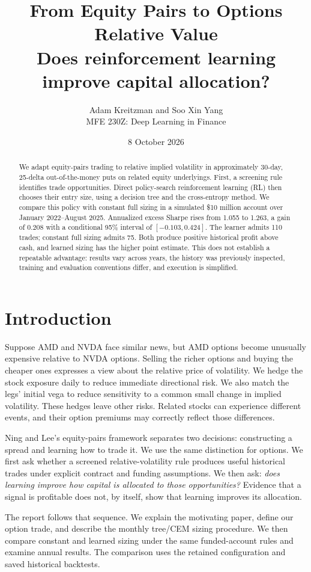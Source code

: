\documentclass[11pt,letterpaper]{article}
\title{\textbf{From Equity Pairs to Options Relative Value}\\[0.4em]
\large Does reinforcement learning improve capital allocation?}
\author{Adam Kreitzman and Soo Xin Yang\\MFE 230Z: Deep Learning in Finance}
\date{8 October 2026}
\newcommand{\money}[1]{\$#1}
\begin{document}
\maketitle
\begin{abstract}
We adapt equity-pairs trading to relative implied volatility in approximately
30-day, 25-delta out-of-the-money puts on related equity underlyings. First, a
screening rule identifies trade opportunities. Direct policy-search reinforcement
learning (RL) then chooses their entry size, using a decision tree and the
cross-entropy method. We compare this policy with constant full sizing in a
simulated \money{10 million} account over January 2022--August 2025. Annualized
excess Sharpe rises from 1.055 to 1.263, a gain of 0.208 with a conditional
95\% interval of $[-0.103,0.424]$. The learner admits 110 trades; constant full
sizing admits 75. Both produce positive historical profit above cash, and
learned sizing has the higher point estimate. This does not establish a
repeatable advantage: results vary across years, the history was previously
inspected, training and evaluation conventions differ, and execution is simplified.
\end{abstract}

\section{Introduction}
Suppose AMD and NVDA face similar news, but AMD options become unusually expensive
relative to NVDA options. Selling the richer options and buying the cheaper ones
expresses a view about the relative price of volatility. We hedge the stock
exposure daily to reduce immediate directional risk. We also match the legs'
initial vega to reduce sensitivity to a common small change in implied volatility.
These hedges leave other risks. Related stocks can experience different events,
and their option premiums may correctly reflect those differences.

Ning and Lee's equity-pairs framework \cite{ning} separates two decisions:
constructing a spread and learning how to trade it. We use the same distinction
for options. We first ask whether a screened relative-volatility rule produces
useful historical trades under explicit contract and funding assumptions. We
then ask: \emph{does learning improve how capital is allocated to those
opportunities?} Evidence that a signal is profitable does not, by itself,
show that learning improves its allocation.

The report follows that sequence. We explain the motivating paper, define our
option trade, and describe the monthly tree/CEM sizing procedure. We then compare
constant and learned sizing under the same funded-account rules and examine
annual results. The comparison uses the retained configuration and saved
historical backtests.
\end{document}
